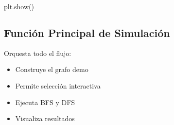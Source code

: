 \documentclass[
  spanish,
  letterpaper,
  DIV=11,
  numbers=noendperiod]{scrartcl}
\newenvironment{Shaded}{\begin{snugshade}}{\end{snugshade}}
\newcommand{\NormalTok}[1]{\textcolor[rgb]{0.00,0.23,0.31}{#1}}
\begin{document}
\begin{Shaded}
\begin{Highlighting}[]
\NormalTok{    plt.show()}
\end{Highlighting}
\end{Shaded}

\subsection{Función Principal de
Simulación}\label{funciuxf3n-principal-de-simulaciuxf3n}

Orquesta todo el flujo:

\begin{itemize}
\item
  Construye el grafo demo
\item
  Permite selección interactiva
\item
  Ejecuta BFS y DFS
\item
  Visualiza resultados
\end{itemize}
\end{document}
